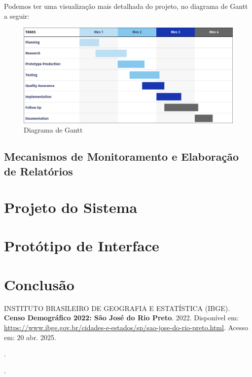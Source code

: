 \documentclass[a4paper, 12pt]{article}
\begin{document}
Podemos ter uma visualização mais detalhada do projeto, no diagrama de Gantt a seguir:

\begin{figure}[h]
    \centering
    \includegraphics[width=\textwidth,keepaspectratio]{2025-04-18_16-03-51_screenshot.png}
    \caption{Diagrama de Gantt}
    \label{fig:enter-label}
\end{figure}



\subsection{Mecanismos de Monitoramento e Elaboração de Relatórios}

\section{Projeto do Sistema}

\newpage
\section{Protótipo de Interface}

\newpage
\section{Conclusão}

\newpage
\renewcommand{\refname}{Bibliografia}
\begin{thebibliography}{09}
 INSTITUTO BRASILEIRO DE GEOGRAFIA E ESTATÍSTICA (IBGE). 
\textbf{Censo Demográfico 2022: São José do Rio Preto}. 
2022. 
Disponível em: \url{https://www.ibge.gov.br/cidades-e-estados/sp/sao-jose-do-rio-preto.html}. 
Acesso em: 20 abr. 2025.

\bibitem{} %
\textbf{}. %

\bibitem{} %
\textbf{}. %

\end{thebibliography}
\end{document}
